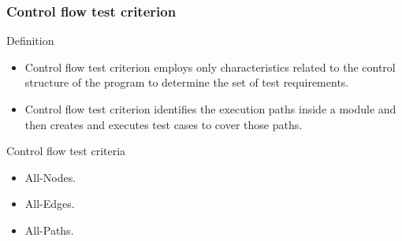 \begin{frame}[parent={cmap:structural-software-testing},hasnext=true,hasprev=false]
\frametitle{Control flow test criterion}
\label{concept:control-flow-test-criterion}

\begin{block:concept}{Definition}
\begin{itemize}
	\item Control flow test criterion employs only characteristics related
	to the control structure of the program to determine the set of test
	requirements.

	\item Control flow test criterion identifies the execution paths
	inside a module and then creates and executes test cases to cover those
	paths.
\end{itemize}
\end{block:concept}

\begin{block:fact}{Control flow test criteria}
\begin{itemize}
	\item All-Nodes.
	\item All-Edges.
	\item All-Paths.
\end{itemize}
\end{block:fact}


\end{frame}


